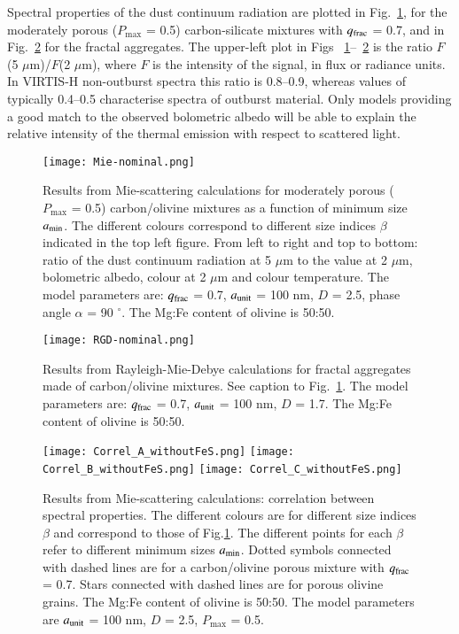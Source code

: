 \documentclass[a4paper,fleqn,usenatbib]{mnras}
\begin{document}
Spectral properties of the dust continuum radiation are plotted in Fig.~\ref{fig:Mie-Nominal}, for the moderately porous ($P_{\max}$ = 0.5) carbon-silicate mixtures with $q_{\rm frac}$ = 0.7, and in Fig.~\ref{fig:RGD-Nominal} for the fractal aggregates. The upper-left plot in Figs ~\ref{fig:Mie-Nominal}--~\ref{fig:RGD-Nominal} is the ratio
$F$(5 $\mu$m)/$F$(2 $\mu$m), where $F$ is the intensity of the signal, in flux or radiance units. In VIRTIS-H non-outburst spectra this ratio is 0.8--0.9, whereas values  of typically 0.4--0.5 characterise spectra of outburst material. Only models providing a good match to the observed bolometric albedo will be able to explain the relative intensity of the thermal emission with respect to scattered light.




   \begin{figure}
   \texttt{[image: Mie-nominal.png]}
    \caption{Results from Mie-scattering calculations for moderately porous ($P_{\max}$ = 0.5) carbon/olivine mixtures  as a function of minimum size $a_{\rm min}$. The different colours correspond to different size indices $\beta$ indicated in the top left figure. From left to right and top to bottom: ratio of the dust continuum radiation at 5 $\mu$m to the value at 2 $\mu$m, bolometric albedo, colour at 2 $\mu$m and colour temperature. The model parameters are: $q_{\rm frac}$ = 0.7, $a_{\rm unit}$ = 100 nm, $D$ = 2.5, phase angle $\alpha$ = 90 $^\circ$. The Mg:Fe content of olivine is 50:50.}
    \label{fig:Mie-Nominal}
\end{figure}

   \begin{figure}
   \texttt{[image: RGD-nominal.png]}
    \caption{Results from Rayleigh-Mie-Debye calculations for fractal aggregates made of  carbon/olivine mixtures. See caption to Fig.~\ref {fig:Mie-Nominal}.
     The model parameters are: $q_{\rm frac}$ = 0.7, $a_{\rm unit}$ = 100 nm, $D$ = 1.7. The Mg:Fe content of olivine is 50:50.}
    \label{fig:RGD-Nominal}
\end{figure}


   \begin{figure}
    \texttt{[image: Correl\_A\_withoutFeS.png]}
    \texttt{[image: Correl\_B\_withoutFeS.png]}
    \texttt{[image: Correl\_C\_withoutFeS.png]}
    \caption{Results from Mie-scattering calculations: correlation between spectral properties. The different colours are for different size indices $\beta$ and correspond to those of Fig.\ref{fig:Mie-Nominal}. The different points for each $\beta$ refer to different minimum sizes $a_{\rm min}$. Dotted symbols connected with dashed lines are for a carbon/olivine porous mixture with $q_{\rm frac}$ = 0.7. Stars connected with dashed lines are for porous olivine grains. The Mg:Fe content of olivine is 50:50. The model parameters are $a_{\rm unit}$ = 100 nm, $D$ = 2.5, $P_{\max}$ = 0.5.}
    \label{fig:Mie-Correl}
\end{figure}
\end{document}
